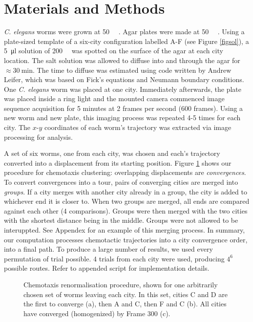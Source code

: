 \documentclass[10pt]{article}
\begin{document}
\section{Materials and Methods}

\textit{C. elegans} worms were grown at \SI{50}{\milli\molar} . Agar plates were made at
\SI{50}{\milli\molar} . Using a plate-sized template of a six-city configuration labelled A-F (see
Figure \ref{figsol}), a \SI{5}{\micro\litre} solution of \SI{200}{\milli\molar}  was spotted on the
surface of the agar at each city location. The salt solution was allowed to diffuse into and through the agar for
$\approx \SI{30}{\minute}$. The time to diffuse was estimated using code written by Andrew Leifer, which was 
based on Fick's equations and Neumann boundary conditions. One \textit{C. elegans} worm was placed at one city.
Immediately afterwards, the plate was placed inside a ring light and the mounted camera commenced image sequence
acquisition for 5 minutes at 2 frames per second (600 frames). Using a new worm and new plate, this imaging
process was repeated 4-5 times for each city. The $x$-$y$ coordinates of each worm's trajectory was extracted
via image processing for analysis.

\par A set of six worms, one from each city, was chosen and each's trajectory converted into a displacement from
its starting position. Figure \ref{figchem} shows our procedure for chemotaxis clustering: overlapping
displacements are \emph{convergences}. To convert convergences into a tour, pairs of converging cities are
merged into \emph{groups}. If a city merges with another city already in a group, the city is added to whichever
end it is closer to. When two groups are merged, all ends are compared against each other (4 comparisons). Groups
were then merged with the two cities with the shortest distance being in the middle. Groups were not allowed to
be interuppted. See Appendex for an example of this merging process. In summary, our computation processes
chemotactic trajectories into a city convergence order, into a final path. To produce a large number of results,
we used every permutation of trial possible. 4 trials from each city were used, producing $4^6$ possible routes.
Refer to appended script for implementation details.

\begin{figure}[H]
	\centering
	\caption{Chemotaxis renormalisation procedure, shown for one arbitrarily chosen set of  worms leaving each city. In this set, cities C and D are the first to converge (a), then A and C, then F and C (b). All cities have converged (homogenized) by Frame 300 (c).}
	\label{figchem}
\end{figure}
\end{document}
